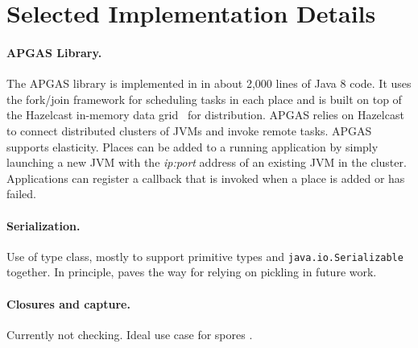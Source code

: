 \section{Selected Implementation Details}
\label{sec:serialization}

\paragraph{APGAS Library.}
The APGAS library is implemented in in about 2,000 lines of Java 8 code. It uses the fork/join framework for scheduling tasks in each place and is built on top of the Hazelcast in-memory data grid~\cite{hazelcast} for distribution. APGAS relies on Hazelcast to connect distributed clusters of JVMs and invoke remote tasks. 
APGAS supports elasticity. Places can be added to a running application by simply launching a new JVM with the \emph{ip:port} address of an existing JVM in the cluster. 
Applications can register a callback that is invoked when a place is added or has failed.


%


\paragraph{Serialization.}
Use of type class, mostly to support primitive types and
\lstinline{java.io.Serializable} together. In principle, paves the way for
relying on pickling \cite{MillerETAL13InstantPicklesGeneratingObjectorientedPicklerCombinators} in future work.

\paragraph{Closures and capture.} Currently not checking. Ideal use case for spores \cite{MillerHallerOdersky14SporesTypebasedFoundationClosuresAgeConcurrency}.
